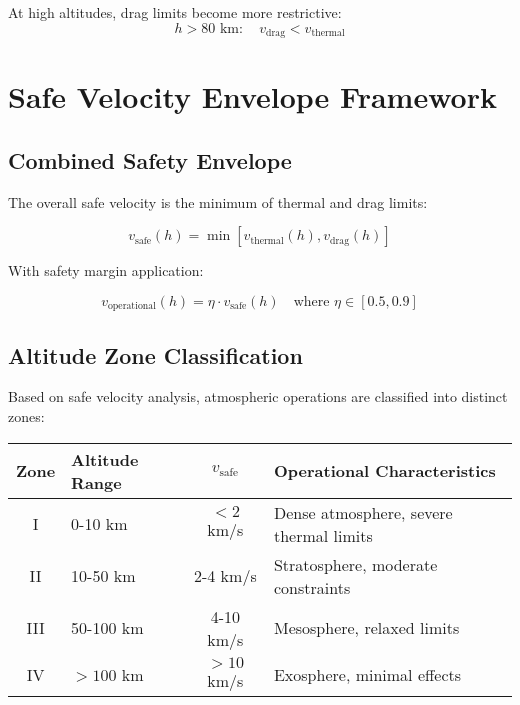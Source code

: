 \documentclass[12pt,a4paper]{article}
\begin{document}
At high altitudes, drag limits become more restrictive:
\begin{equation}
h > 80 \text{ km}: \quad v_{\text{drag}} < v_{\text{thermal}}
\end{equation}

\section{Safe Velocity Envelope Framework}

\subsection{Combined Safety Envelope}

The overall safe velocity is the minimum of thermal and drag limits:

\begin{equation}
v_{\text{safe}}(h) = \min[v_{\text{thermal}}(h), v_{\text{drag}}(h)]
\end{equation}

With safety margin application:

\begin{equation}
v_{\text{operational}}(h) = \eta \cdot v_{\text{safe}}(h) \quad \text{where } \eta \in [0.5, 0.9]
\end{equation}

\subsection{Altitude Zone Classification}

Based on safe velocity analysis, atmospheric operations are classified into distinct zones:

\begin{center}
\begin{tabular}{|c|p{3cm}|c|p{4cm}|}
\hline
\textbf{Zone} & \textbf{Altitude Range} & \textbf{$v_{\text{safe}}$} & \textbf{Operational Characteristics} \\
\hline
I & 0-10 km & $<2$ km/s & Dense atmosphere, severe thermal limits \\
II & 10-50 km & 2-4 km/s & Stratosphere, moderate constraints \\
III & 50-100 km & 4-10 km/s & Mesosphere, relaxed limits \\
IV & $>100$ km & $>10$ km/s & Exosphere, minimal effects \\
\hline
\end{tabular}
\end{center}
\end{document}
